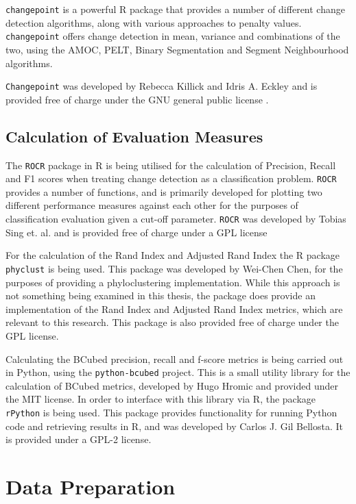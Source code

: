 \documentclass{uvamscse}	%
\begin{document}
\texttt{changepoint} is a powerful R package that provides a number of different change detection algorithms, along with various approaches to penalty values. \texttt{changepoint} offers change detection in mean, variance and combinations of the two, using the AMOC, PELT, Binary Segmentation and Segment Neighbourhood algorithms.

\texttt{Changepoint} was developed by Rebecca Killick and Idris A. Eckley and is provided free of charge under the GNU general public license \cite{Killick2014}.

\subsection{Calculation of Evaluation Measures}

The \texttt{ROCR} package in \textsf{R} is being utilised for the calculation of Precision, Recall and F1 scores when treating change detection as a classification problem. \texttt{ROCR} provides a number of functions, and is primarily developed for plotting two different performance measures against each other for the purposes of classification evaluation given a cut-off parameter. \texttt{ROCR} was developed by Tobias Sing et. al. and is provided free of charge under a GPL license

For the calculation of the Rand Index and Adjusted Rand Index the \textsf{R} package \texttt{phyclust} is being used. This package was developed by Wei-Chen Chen, for the purposes of providing a phyloclustering implementation. While this approach is not something being examined in this thesis, the package does provide an implementation of the Rand Index and Adjusted Rand Index metrics, which are relevant to this research. This package is also provided free of charge under the GPL license.

Calculating the BCubed precision, recall and f-score metrics is being carried out in Python, using the \texttt{python-bcubed} project. This is a small utility library for the calculation of BCubed metrics, developed by Hugo Hromic and provided under the MIT license. In order to interface with this library via \textsf{R}, the package \texttt{rPython} is being used. This package provides functionality for running Python code and retrieving results in \textsf{R}, and was developed by Carlos J. Gil Bellosta. It is provided under a GPL-2 license.

\section{Data Preparation}
\end{document}
